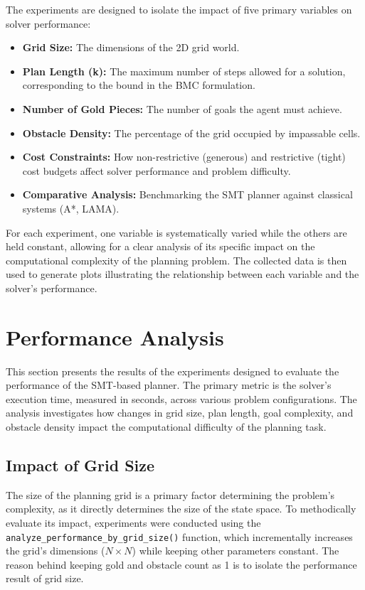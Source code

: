 \documentclass[12pt, a4paper, oneside]{report} %
\begin{document}
The experiments are designed to isolate the impact of five primary variables on solver performance:
\begin{itemize}
    \item \textbf{Grid Size:} The dimensions of the 2D grid world.
    \item \textbf{Plan Length (k):} The maximum number of steps allowed for a solution, corresponding to the bound in the BMC formulation.
    \item \textbf{Number of Gold Pieces:} The number of goals the agent must achieve.
    \item \textbf{Obstacle Density:} The percentage of the grid occupied by impassable cells.
    \item \textbf{Cost Constraints:} How non-restrictive (generous) and restrictive (tight) cost budgets affect solver performance and problem difficulty.
    \item \textbf{Comparative Analysis:} Benchmarking the SMT planner against classical systems (A*, LAMA).
\end{itemize}

For each experiment, one variable is systematically varied while the others are held constant, allowing for a clear analysis of its specific impact on the computational complexity of the planning problem. The collected data is then used to generate plots illustrating the relationship between each variable and the solver's performance.
\section{Performance Analysis}
\label{sec:perf_analysis}

This section presents the results of the experiments designed to evaluate the performance of the SMT-based planner. The primary metric is the solver's execution time, measured in seconds, across various problem configurations. The analysis investigates how changes in grid size, plan length, goal complexity, and obstacle density impact the computational difficulty of the planning task.
\subsection{Impact of Grid Size}
\label{sec:impact_grid_size}

The size of the planning grid is a primary factor determining the problem's complexity, as it directly determines the size of the state space. To methodically evaluate its impact, experiments were conducted using the \texttt{analyze\_performance\_by\_grid\_size()} function, which incrementally increases the grid's dimensions ($N \times N$) while keeping other parameters constant. The reason behind keeping gold and obstacle count as 1 is to isolate the performance result of grid size.
\end{document}
